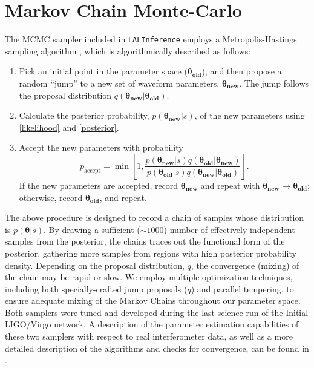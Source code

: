 \documentclass[11pt,a4paper]{emulateapj} 
\newcommand{\thpara}{\boldsymbol{\theta}}
\begin{document}
 {}

\appendix

\section{Markov Chain Monte-Carlo}
\label{appendixMCMC}
  
  The MCMC sampler included in \texttt{LALInference} employs a Metropolis-Hastings sampling algorithm , which is
   algorithmically described as follows:
  
\begin{enumerate}
\item Pick an initial point in the parameter space
  ($\boldsymbol{\theta_{\text{old}}}$), and then propose a random
  ``jump'' to a new set of waveform parameters,
  $\boldsymbol{\theta_{\text{new}}}$.  The jump follows the
  proposal distribution $q\left(
  \boldsymbol{\theta_{\text{new}}} | \boldsymbol{\theta_{\text{old}}}
  \right)$.
\item Calculate the posterior probability,
  $p(\boldsymbol{\theta_{\text{new}}}|s)$, of the new parameters using
  \eqref{likelihood} and \eqref{posterior}.
\item Accept the new parameters with probability
  \begin{equation}
    p_\mathrm{accept} = \min \left[ 1,
      \frac{p(\boldsymbol{\theta_{\text{new}}}|s)
        q\left(\boldsymbol{\theta_{\text{old}}} |
        \boldsymbol{\theta_{\text{new}}}
        \right)}{p(\boldsymbol{\theta_{\text{old}}}|s)
        q\left(\boldsymbol{\theta_{\text{new}}} |
        \boldsymbol{\theta_{\text{old}}} \right)} \right].
  \end{equation}
  If the new parameters are accepted, record
  $\boldsymbol{\theta_\text{new}}$ and repeat with
  $\boldsymbol{\theta_\text{new}} \rightarrow
  \boldsymbol{\theta_\text{old}}$; otherwise, record
  $\boldsymbol{\theta_\text{old}}$, and repeat.
\end{enumerate} 
  
The above procedure is designed to record a chain of samples whose
distribution is $p\left(\thpara|s\right)$.  By drawing a sufficient
($\sim1000$) number of effectively independent samples from the
posterior, the chains traces out the functional form of the posterior,
gathering more samples from regions with high posterior probability
density.  Depending on the proposal distribution, $q$, the convergence
(mixing) of the chain may be rapid or slow.  We employ multiple
optimization techniques, including both specially-crafted jump
proposals ($q$) and parallel tempering, to ensure adequate mixing of
the Markov Chains throughout our parameter space.  Both samplers were
tuned and developed during the last science run of the Initial
LIGO/Virgo network.  A description of the parameter estimation
capabilities of these two samplers with respect to real interferometer
data, as well as a more detailed description of the algorithms and
checks for convergence, can be found in \cite{S6PE}.
  
\end{document}
